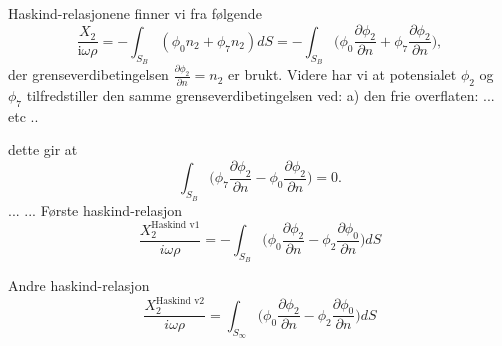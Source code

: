 Haskind-relasjonene finner vi fra følgende 
\begin{equation}
\frac{X_2}{\mathrm{i} \omega \rho}  =  - \int_{S_B}  ( \phi_0 n_2 + \phi_7 n_2) dS = - \int_{S_B}  \Big( \phi_0 \frac{\partial \phi_2}{\partial n} + \phi_7 \frac{\partial \phi_2}{\partial n} \Big),
\end{equation}
der grenseverdibetingelsen $\frac{\partial \phi_2}{\partial n} = n_2$ er brukt. Videre har vi at potensialet $\phi_2$ og $\phi_7$ tilfredstiller den samme grenseverdibetingelsen ved: a) den frie overflaten: 
... etc ..

dette gir at 
\begin{equation}
\int_{S_B}  \big( \phi_7 \frac{\partial \phi_2}{\partial n} -\phi_0 \frac{\partial \phi_2}{\partial n}  \big) = 0. 
\end{equation}
...
%
...
Første haskind-relasjon
\begin{equation}
\frac{X_2^{\text{Haskind v1}}}{i \omega \rho} = -\int_{S_B}  \big( \phi_0 \frac{\partial \phi_2}{\partial n} -\phi_2 \frac{\partial \phi_0}{\partial n}  \big) dS 
\end{equation}

Andre haskind-relasjon
\begin{equation}
\frac{X_2^{\text{Haskind v2}}}{i \omega \rho} = \int_{S_\infty}  \big( \phi_0 \frac{\partial \phi_2}{\partial n} -\phi_2 \frac{\partial \phi_0}{\partial n}  \big) dS 
\end{equation}



